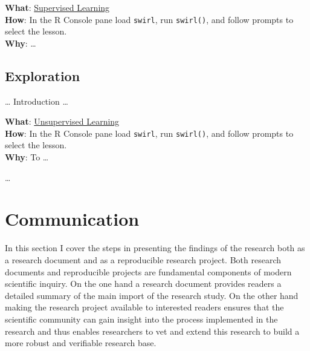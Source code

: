 \documentclass[
  letterpaper,
]{latex/krantz}
\begin{document}
\begin{tcolorbox}[enhanced jigsaw, toprule=.15mm, bottomtitle=1mm, coltitle=black, title=\textcolor{quarto-callout-tip-color}{\faLightbulb}\hspace{0.5em}{Swirl}, left=2mm, colframe=quarto-callout-tip-color-frame, bottomrule=.15mm, colbacktitle=quarto-callout-tip-color!10!white, leftrule=.75mm, colback=white, titlerule=0mm, breakable, toptitle=1mm, opacityback=0, arc=.35mm, rightrule=.15mm, opacitybacktitle=0.6]

\textbf{What}: \href{https://github.com/lin380/swirl}{Supervised
Learning}\\
\textbf{How}: In the R Console pane load \texttt{swirl}, run
\texttt{swirl()}, and follow prompts to select the lesson.\\
\textbf{Why}: \ldots{}

\end{tcolorbox}

\hypertarget{sec-exploration}{%
\chapter{Exploration}\label{sec-exploration}}

\ldots{} Introduction \ldots{}

\begin{tcolorbox}[enhanced jigsaw, toprule=.15mm, bottomtitle=1mm, coltitle=black, title=\textcolor{quarto-callout-tip-color}{\faLightbulb}\hspace{0.5em}{Swirl}, left=2mm, colframe=quarto-callout-tip-color-frame, bottomrule=.15mm, colbacktitle=quarto-callout-tip-color!10!white, leftrule=.75mm, colback=white, titlerule=0mm, breakable, toptitle=1mm, opacityback=0, arc=.35mm, rightrule=.15mm, opacitybacktitle=0.6]

\textbf{What}: \href{https://github.com/lin380/swirl}{Unsupervised
Learning}\\
\textbf{How}: In the R Console pane load \texttt{swirl}, run
\texttt{swirl()}, and follow prompts to select the lesson.\\
\textbf{Why}: To \ldots{}

\end{tcolorbox}

\ldots{}

\part{Communication}

In this section I cover the steps in presenting the findings of the
research both as a research document and as a reproducible research
project. Both research documents and reproducible projects are
fundamental components of modern scientific inquiry. On the one hand a
research document provides readers a detailed summary of the main import
of the research study. On the other hand making the research project
available to interested readers ensures that the scientific community
can gain insight into the process implemented in the research and thus
enables researchers to vet and extend this research to build a more
robust and verifiable research base.
\end{document}
